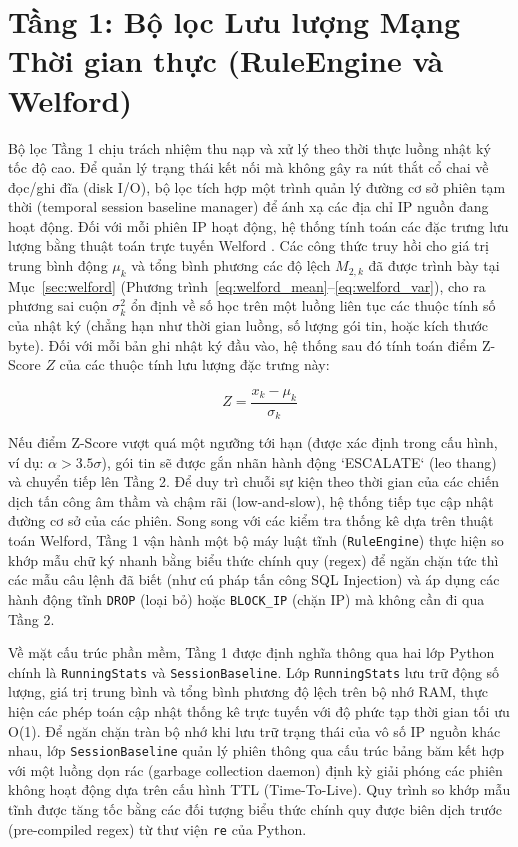 \section{Tầng 1: Bộ lọc Lưu lượng Mạng Thời gian thực (RuleEngine và Welford)}

Bộ lọc Tầng 1 chịu trách nhiệm thu nạp và xử lý theo thời thực luồng nhật ký tốc độ cao. Để quản lý trạng thái kết nối mà không gây ra nút thắt cổ chai về đọc/ghi đĩa (disk I/O), bộ lọc tích hợp một trình quản lý đường cơ sở phiên tạm thời (temporal session baseline manager) để ánh xạ các địa chỉ IP nguồn đang hoạt động. Đối với mỗi phiên IP hoạt động, hệ thống tính toán các đặc trưng lưu lượng bằng thuật toán trực tuyến Welford \cite{welford1962}. Các công thức truy hồi cho giá trị trung bình động $\mu_k$ và tổng bình phương các độ lệch $M_{2,k}$ đã được trình bày tại Mục~\ref{sec:welford} (Phương trình~\ref{eq:welford_mean}--\ref{eq:welford_var}), cho ra phương sai cuộn $\sigma_k^2$ ổn định về số học trên một luồng liên tục các thuộc tính số của nhật ký (chẳng hạn như thời gian luồng, số lượng gói tin, hoặc kích thước byte). Đối với mỗi bản ghi nhật ký đầu vào, hệ thống sau đó tính toán điểm Z-Score $Z$ của các thuộc tính lưu lượng đặc trưng này:

\begin{equation}
    Z = \frac{x_k - \mu_k}{\sigma_k}
\end{equation}

Nếu điểm Z-Score vượt quá một ngưỡng tới hạn (được xác định trong cấu hình, ví dụ: $\alpha > 3.5\sigma$), gói tin sẽ được gắn nhãn hành động `ESCALATE` (leo thang) và chuyển tiếp lên Tầng 2. Để duy trì chuỗi sự kiện theo thời gian của các chiến dịch tấn công âm thầm và chậm rãi (low-and-slow), hệ thống tiếp tục cập nhật đường cơ sở của các phiên. Song song với các kiểm tra thống kê dựa trên thuật toán Welford, Tầng 1 vận hành một bộ máy luật tĩnh (\texttt{RuleEngine}) thực hiện so khớp mẫu chữ ký nhanh bằng biểu thức chính quy (regex) để ngăn chặn tức thì các mẫu câu lệnh đã biết (như cú pháp tấn công SQL Injection) và áp dụng các hành động tĩnh \texttt{DROP} (loại bỏ) hoặc \texttt{BLOCK\_IP} (chặn IP) mà không cần đi qua Tầng 2.

Về mặt cấu trúc phần mềm, Tầng 1 được định nghĩa thông qua hai lớp Python chính là \texttt{RunningStats} và \texttt{SessionBaseline}. Lớp \texttt{RunningStats} lưu trữ động số lượng, giá trị trung bình và tổng bình phương độ lệch trên bộ nhớ RAM, thực hiện các phép toán cập nhật thống kê trực tuyến với độ phức tạp thời gian tối ưu O(1). Để ngăn chặn tràn bộ nhớ khi lưu trữ trạng thái của vô số IP nguồn khác nhau, lớp \texttt{SessionBaseline} quản lý phiên thông qua cấu trúc bảng băm kết hợp với một luồng dọn rác (garbage collection daemon) định kỳ giải phóng các phiên không hoạt động dựa trên cấu hình TTL (Time-To-Live). Quy trình so khớp mẫu tĩnh được tăng tốc bằng các đối tượng biểu thức chính quy được biên dịch trước (pre-compiled regex) từ thư viện \texttt{re} của Python.

